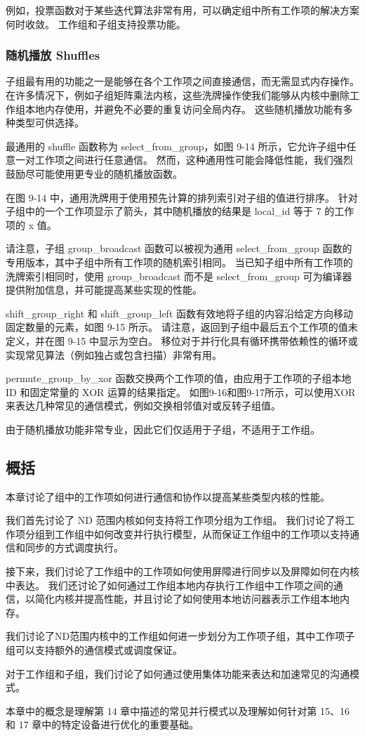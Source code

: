 例如，投票函数对于某些迭代算法非常有用，可以确定组中所有工作项的解决方案何时收敛。 工作组和子组支持投票功能。

\subsubsection{随机播放 Shuffles}
子组最有用的功能之一是能够在各个工作项之间直接通信，而无需显式内存操作。 在许多情况下，例如子组矩阵乘法内核，这些洗牌操作使我们能够从内核中删除工作组本地内存使用，并避免不必要的重复访问全局内存。 这些随机播放功能有多种类型可供选择。

最通用的 shuffle 函数称为 select\_from\_group，如图 9-14 所示，它允许子组中任意一对工作项之间进行任意通信。 然而，这种通用性可能会降低性能，我们强烈鼓励尽可能使用更专业的随机播放函数。

在图 9-14 中，通用洗牌用于使用预先计算的排列索引对子组的值进行排序。 针对子组中的一个工作项显示了箭头，其中随机播放的结果是 local\_id 等于 7 的工作项的 x 值。

请注意，子组 group\_broadcast 函数可以被视为通用 select\_from\_group 函数的专用版本，其中子组中所有工作项的随机索引相同。 当已知子组中所有工作项的洗牌索引相同时，使用 group\_broadcast 而不是 select\_from\_group 可为编译器提供附加信息，并可能提高某些实现的性能。

shift\_group\_right 和 shift\_group\_left 函数有效地将子组的内容沿给定方向移动固定数量的元素，如图 9-15 所示。 请注意，返回到子组中最后五个工作项的值未定义，并在图 9-15 中显示为空白。 移位对于并行化具有循环携带依赖性的循环或实现常见算法（例如独占或包含扫描）非常有用。

permute\_group\_by\_xor 函数交换两个工作项的值，由应用于工作项的子组本地 ID 和固定常量的 XOR 运算的结果指定。 如图9-16和图9-17所示，可以使用XOR来表达几种常见的通信模式，例如交换相邻值对或反转子组值。

由于随机播放功能非常专业，因此它们仅适用于子组，不适用于工作组。

\subsection{概括}
本章讨论了组中的工作项如何进行通信和协作以提高某些类型内核的性能。

我们首先讨论了 ND 范围内核如何支持将工作项分组为工作组。 我们讨论了将工作项分组到工作组中如何改变并行执行模型，从而保证工作组中的工作项以支持通信和同步的方式调度执行。

接下来，我们讨论了工作组中的工作项如何使用屏障进行同步以及屏障如何在内核中表达。 我们还讨论了如何通过工作组本地内存执行工作组中工作项之间的通信，以简化内核并提高性能，并且讨论了如何使用本地访问器表示工作组本地内存。

我们讨论了ND范围内核中的工作组如何进一步划分为工作项子组，其中工作项子组可以支持额外的通信模式或调度保证。

对于工作组和子组，我们讨论了如何通过使用集体功能来表达和加速常见的沟通模式。

本章中的概念是理解第 14 章中描述的常见并行模式以及理解如何针对第 15、16 和 17 章中的特定设备进行优化的重要基础。